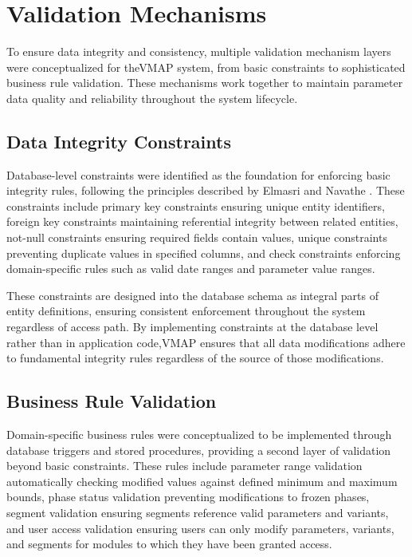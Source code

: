 \section{Validation Mechanisms}
\label{sec:validation-mechanisms}

To ensure data integrity and consistency, multiple validation mechanism layers were conceptualized for the\ac{VMAP} system, from basic constraints to sophisticated business rule validation. These mechanisms work together to maintain parameter data quality and reliability throughout the system lifecycle.

\subsection{Data Integrity Constraints}
\label{subsec:data-integrity-constraints}

Database-level constraints were identified as the foundation for enforcing basic integrity rules, following the principles described by Elmasri and Navathe \cite{elmasri2015fundamentals}. These constraints include primary key constraints ensuring unique entity identifiers, foreign key constraints maintaining referential integrity between related entities, not-null constraints ensuring required fields contain values, unique constraints preventing duplicate values in specified columns, and check constraints enforcing domain-specific rules such as valid date ranges and parameter value ranges.

These constraints are designed into the database schema as integral parts of entity definitions, ensuring consistent enforcement throughout the system regardless of access path. By implementing constraints at the database level rather than in application code,\ac{VMAP} ensures that all data modifications adhere to fundamental integrity rules regardless of the source of those modifications.

\subsection{Business Rule Validation}
\label{subsec:business-rule-validation}

Domain-specific business rules were conceptualized to be implemented through database triggers and stored procedures, providing a second layer of validation beyond basic constraints. These rules include parameter range validation automatically checking modified values against defined minimum and maximum bounds, phase status validation preventing modifications to frozen phases, segment validation ensuring segments reference valid parameters and variants, and user access validation ensuring users can only modify parameters, variants, and segments for modules to which they have been granted access.

